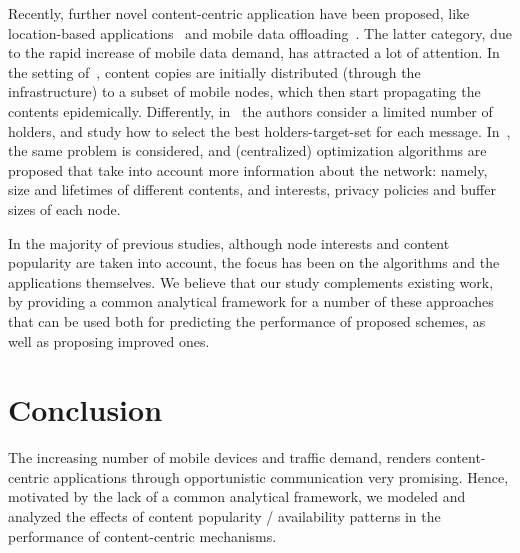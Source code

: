 \documentclass[journal]{IEEEtran}
\begin{document}

Recently, further novel content-centric application have been proposed, like location-based applications~\cite{MobComp-next-decade,Ott-oppnet-applications} and mobile data offloading~\cite{offloading-wowmom11,Hui-Offloading, multiple-offloading}. The latter category, due to the rapid increase of mobile data demand, has attracted a lot of attention. In the setting of~\cite{offloading-wowmom11}, content copies are initially distributed (through the infrastructure) to a subset of mobile nodes, which then start propagating the contents epidemically. Differently, in~\cite{Hui-Offloading} the authors consider a limited number of holders, and study how to select the best holders-target-set for each message. In~\cite{multiple-offloading}, the same problem is considered, and (centralized) optimization algorithms are proposed that take into account more information about the network: namely, size and lifetimes of different contents, and interests, privacy policies and buffer sizes of each node. 


In the majority of previous studies, although node interests and content popularity are taken into account, the focus has been on the algorithms and the applications themselves. We believe that our study complements existing work, by providing a common analytical framework for a number of these approaches that can be used both for predicting the performance of proposed schemes, as well as proposing improved ones.










\section{Conclusion}\label{sec:conclusion}
The increasing number of mobile devices and traffic demand, renders content-centric applications through opportunistic communication very promising. Hence, motivated by the lack of a common analytical framework, we modeled and analyzed the effects of content popularity / availability patterns in the performance of content-centric mechanisms.
\end{document}
